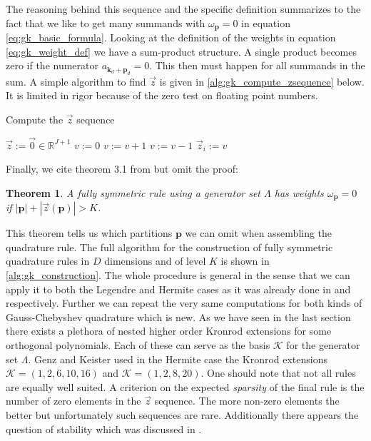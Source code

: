\documentclass[a4paper,10pt]{article}
\newtheorem*{theorem*}{Theorem}
\begin{document}
The reasoning behind this sequence and the specific definition summarizes to
the fact that we like to get many summands with $\omega_{\mathbf{p}} = 0$ in
equation \eqref{eq:gk_basic_formula}. Looking at the definition of the weights
in equation \eqref{eq:gk_weight_def} we have a sum-product structure. A single
product becomes zero if the numerator $a_{\mathbf{k}_d+\mathbf{p}_d} = 0$. This
then must happen for all summands in the sum. A simple algorithm to find $\vec{z}$
is given in \eqref{alg:gk_compute_zsequence} below. It is limited in rigor because
of the zero test on floating point numbers.

\begin{algorithm}[h!]
  \caption{Compute the $\vec{z}$ sequence}
  \label{alg:gk_compute_zsequence}
  \begin{algorithmic}
      \State $\vec{z} := \vec{0} \in \mathbb{R}^{J+1}$
      \State $v := 0$
            \State $v := v + 1$
          \EndWhile
        \Else
          \State $v := v - 1$
        \EndIf
        \State $\vec{z}_i := v$
      \EndFor
    \EndProcedure
  \end{algorithmic}
\end{algorithm}

Finally, we cite theorem 3.1 from \cite{genz} but omit the proof:

\begin{theorem*}
  \label{th:zero_weights}
  A fully symmetric rule using a generator set $\Lambda$ has weights $\omega_{\mathbf{p}} = 0$
  if $|\mathbf{p}| + |\vec{z}(\mathbf{p})| > K$.
\end{theorem*}

This theorem tells us which partitions $\mathbf{p}$ we can omit when assembling
the quadrature rule. The full algorithm for the construction of fully symmetric quadrature
rules in $D$ dimensions and of level $K$ is shown in \eqref{alg:gk_construction}.
The whole procedure is general in the sense that we can apply it to both the Legendre and
Hermite cases as it was already done in \cite{genz} and \cite{genz-keister} respectively.
Further we can repeat the very same computations for both kinds of Gauss-Chebyshev
quadrature which is new. As we have seen in the last section there exists a plethora
of nested higher order Kronrod extensions for some orthogonal polynomials. Each of these
can serve as the basis $\mathcal{K}$ for the generator set $\Lambda$. Genz and Keister used in
the Hermite case the Kronrod extensions $\mathcal{K} = (1, 2, 6, 10, 16)$ and $\mathcal{K} = (1, 2, 8, 20)$.
One should note that not all rules are equally well suited. A criterion on the expected
\emph{sparsity} of the final rule is the number of zero elements in the $\vec{z}$ sequence.
The more non-zero elements the better but unfortunately such sequences are rare.
Additionally there appears the question of stability which was discussed in \cite{genz}.
\end{document}
